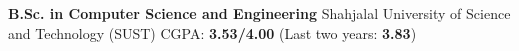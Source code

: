 %
%
%


\begin{scholarship}
					{\textbf{B.Sc. in Computer Science and Engineering}}
                        {Shahjalal University of Science and Technology (SUST)}
                            {CGPA: \textbf{3.53/4.00} (Last two years: \textbf{3.83})}
\end{scholarship}